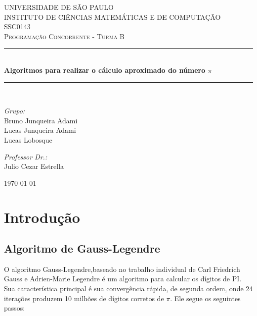 \documentclass[a4paper]{article}
\newcommand{\HRule}{\rule{\linewidth}{0.5mm}}
\begin{document}
\begin{titlepage}
\begin{center}	

\textsc{\Large UNIVERSIDADE DE SÃO PAULO\\
	INSTITUTO DE CIÊNCIAS MATEMÁTICAS E DE COMPUTAÇÃO}\\[0.7cm]

\textsc{\Large SSC0143}\\[0.2cm]
\textsc{\Large Programação Concorrente - Turma B}\\[0.5cm]

\HRule \\[0.4cm]
{ \huge \bfseries Algoritmos para realizar o cálculo aproximado do número \begin{math}\pi\end{math}}\\[0.4cm]
\HRule \\[1.5cm]

\begin{minipage}{0.4\textwidth}
\begin{flushleft} \large
\emph{Grupo:}\\
Bruno Junqueira Adami\\
Lucas Junqueira Adami\\
Lucas Lobosque
\end{flushleft}
\end{minipage}
\begin{minipage}{0.4\textwidth}
\begin{flushright} \large
\emph{Professor Dr.:}\\
Julio Cezar Estrella
\end{flushright}
\end{minipage}

\vfill

{\large \today}
	
\end{center}
\end{titlepage}

\section{Introdução}
\subsection{Algoritmo de Gauss-Legendre}
O algoritmo Gauss-Legendre,baseado no trabalho individual de Carl Friedrich Gauss 
e Adrien-Marie Legendre é um algoritmo para calcular os dígitos de PI. Sua
característica principal é sua convergência rápida, de segunda ordem, onde 24 
iterações produzem 10 milhões de dígitos corretos de \begin{math}\pi\end{math}. Ele segue os seguintes 
passos:
\end{document}

